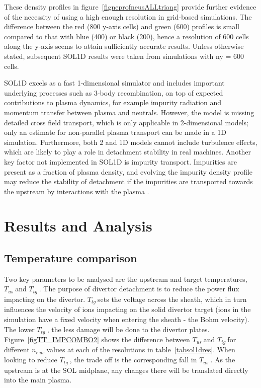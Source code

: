 \documentclass[12pt]{article}  %
\providecommand{\neus}{$n_{e~us}~$} %
\providecommand{\Tus}{$T_{us}~$} %
\providecommand{\Ttg}{$T_{tg}~$} %
\begin{document}
These density profiles in figure~\ref{figneprofneusALLtriang} provide further evidence of the necessity of using a high enough resolution in grid-based simulations. The difference between the red (800 y-axis cells) and green (600) profiles is small compared to that with blue (400) or black (200), hence a resolution of 600 cells along the y-axis seems to attain sufficiently accurate results. Unless otherwise stated, subsequent SOL1D results were taken from simulations with ny = 600 cells.


SOL1D excels as a fast 1-dimensional simulator and includes important underlying processes such as 3-body recombination, on top of expected contributions to plasma dynamics, for example impurity radiation and momentum transfer between plasma and neutrals. However, the model is missing detailed cross field transport, which is only applicable in 2-dimensional models; only an estimate for non-parallel plasma transport can be made in a 1D simulation. Furthermore, both 2 and 1D models cannot include turbulence effects, which are likely to play a role in detachment stability in real machines. Another key factor not implemented in SOL1D is impurity transport. Impurities are present as a fraction of plasma density, and evolving the impurity density profile may reduce the stability of detachment if the impurities are transported towards the upstream by interactions with the plasma \cite{Nakazawa2000}.

\section{Results and Analysis}\label{secResults}
\subsection{Temperature comparison}\label{ssectempcomp}
Two key parameters to be analysed are the upstream and target temperatures, \Tus and \Ttg. The purpose of divertor detachment is to reduce the power flux impacting on the divertor. \Ttg sets the voltage across the sheath, which in turn influences the velocity of ions impacting on the solid divertor target (ions in the simulation have a fixed velocity when entering the sheath - the Bohm velocity). The lower \Ttg, the less damage will be done to the divertor plates. Figure~\ref{figTT_IMPCOMBO2} shows the difference between \Tus and \Ttg for different \neus values at each of the resolutions in table~\ref{tabsol1dres}. When looking to reduce \Ttg, the trade off is the corresponding fall in \Tus. As the upstream is at the SOL midplane, any changes there will be translated directly into the main plasma. 
\end{document}
